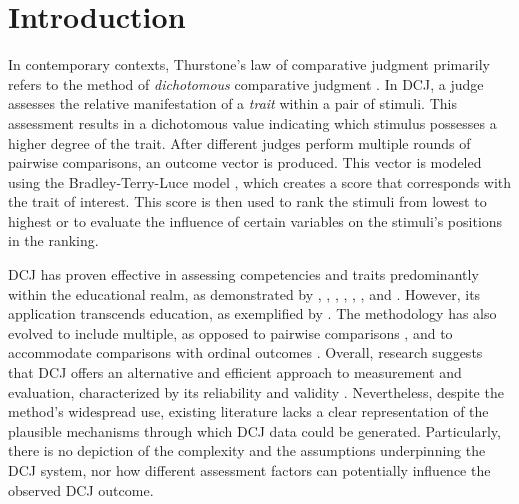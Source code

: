 \documentclass[
  authoryear,
  preprint,
  1p]{elsarticle}
\begin{document}
\section{Introduction}\label{sec-introduction}

In contemporary contexts, Thurstone's law of comparative judgment
\citeyearpar{Thurstone_1927} primarily refers to the method of
\emph{dichotomous} comparative judgment
\citep[DCJ,][]{Pollitt_2012a, Pollitt_2012b}. In DCJ, a judge assesses
the relative manifestation of a \emph{trait} within a pair of stimuli.
This assessment results in a dichotomous value indicating which stimulus
possesses a higher degree of the trait. After different judges perform
multiple rounds of pairwise comparisons, an outcome vector is produced.
This vector is modeled using the Bradley-Terry-Luce model
\citep[BTL,][]{Bradley_et_al_1952, Luce_1959}, which creates a score
that corresponds with the trait of interest. This score is then used to
rank the stimuli from lowest to highest or to evaluate the influence of
certain variables on the stimuli's positions in the ranking.

DCJ has proven effective in assessing competencies and traits
predominantly within the educational realm, as demonstrated by
\citet{Pollitt_2012b}, \citet{Jones_2015}, \citet{vanDaal_et_al_2016},
\citet{Bartholomew_et_al_2018}, \citet{Lesterhuis_2018},
\citet{Bartholomew_et_al_2020}, and \citet{Marshall_et_al_2020}.
However, its application transcends education, as exemplified by
\citet{Boonen_et_al_2020}. The methodology has also evolved to include
multiple, as opposed to pairwise comparisons
\citep{Luce_1959, Placket_1975}, and to accommodate comparisons with
ordinal outcomes \citep{Tutz_1986, Agresti_1992}. Overall, research
suggests that DCJ offers an alternative and efficient approach to
measurement and evaluation, characterized by its reliability and
validity
\citep{Lesterhuis_2018, vanDaal_2020, Marshall_et_al_2020, Bouwer_et_al_2023}.
Nevertheless, despite the method's widespread use, existing literature
lacks a clear representation of the plausible mechanisms through which
DCJ data could be generated. Particularly, there is no depiction of the
complexity and the assumptions underpinning the DCJ system, nor how
different assessment factors can potentially influence the observed DCJ
outcome.
\end{document}
